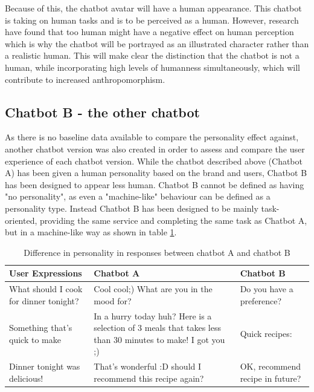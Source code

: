     Because of this, the chatbot avatar will have a human appearance. This chatbot is taking on human tasks and is to be perceived as a human. However, research have found that too human might have a negative effect on human perception which is why the chatbot will be portrayed as an illustrated character rather than a realistic human. This will make clear the distinction that the chatbot is not a human, while incorporating high levels of humanness simultaneously, which will contribute to increased anthropomorphism.
    
\vspace{5mm}

    \subsection{Chatbot B - the other chatbot}
    As there is no baseline data available to compare the personality effect against, another chatbot version was also created in order to assess and compare the user experience of each chatbot version. While the chatbot described above (Chatbot A) has been given a human personality based on the brand and users, Chatbot B has been designed to appear less human. Chatbot B cannot be defined as having "no personality", as even a "machine-like" behaviour can be defined as a personality type. Instead Chatbot B has been designed to be mainly task-oriented, providing the same service and completing the same task as Chatbot A, but in a machine-like way as shown in table \ref{table:3}.
    
    \begin{table}[h]
    \begin{tabular}{ |p{3cm}||p{5cm}||p{5cm}| }
     \hline
        User Expressions & Chatbot A & Chatbot B \\
     \hline
        What should I cook for dinner tonight? &    Cool cool;) What are you in the mood for?   & Do you have a preference? \\
     \hline   
        Something that's quick to make &   In a hurry today huh? Here is a selection of 3 meals that takes less than 30 minutes to make! I got you ;)  & Quick recipes: \\
     \hline
        Dinner tonight was delicious! & That's wonderful :D should I recommend this recipe again?  & OK, recommend recipe in future? \\
     \hline
    \end{tabular}
    \caption{Difference in personality in responses between chatbot A and chatbot B}
    \label{table:3}
    \end{table}
    
